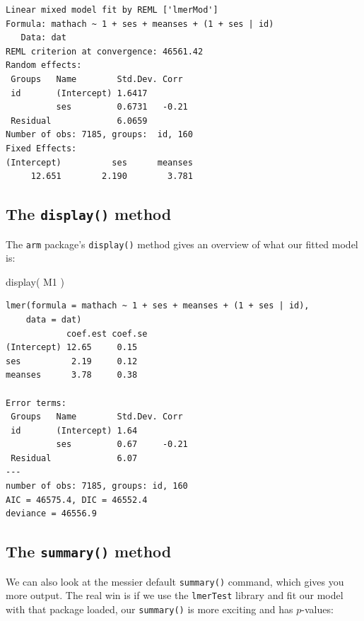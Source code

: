 \documentclass[
  letterpaper,
  DIV=11,
  numbers=noendperiod]{scrreprt}
\newenvironment{Shaded}{}{}
\newcommand{\FunctionTok}[1]{\textcolor[rgb]{0.02,0.16,0.49}{#1}}
\newcommand{\NormalTok}[1]{#1}
\begin{document}
\begin{verbatim}
Linear mixed model fit by REML ['lmerMod']
Formula: mathach ~ 1 + ses + meanses + (1 + ses | id)
   Data: dat
REML criterion at convergence: 46561.42
Random effects:
 Groups   Name        Std.Dev. Corr 
 id       (Intercept) 1.6417        
          ses         0.6731   -0.21
 Residual             6.0659        
Number of obs: 7185, groups:  id, 160
Fixed Effects:
(Intercept)          ses      meanses  
     12.651        2.190        3.781  
\end{verbatim}

\subsection{\texorpdfstring{The \texttt{display()}
method}{The display() method}}\label{the-display-method}

The \texttt{arm} package's \texttt{display()} method gives an overview
of what our fitted model is:

\begin{Shaded}
\begin{Highlighting}[]
\FunctionTok{display}\NormalTok{( M1 )}
\end{Highlighting}
\end{Shaded}

\begin{verbatim}
lmer(formula = mathach ~ 1 + ses + meanses + (1 + ses | id), 
    data = dat)
            coef.est coef.se
(Intercept) 12.65     0.15  
ses          2.19     0.12  
meanses      3.78     0.38  

Error terms:
 Groups   Name        Std.Dev. Corr  
 id       (Intercept) 1.64           
          ses         0.67     -0.21 
 Residual             6.07           
---
number of obs: 7185, groups: id, 160
AIC = 46575.4, DIC = 46552.4
deviance = 46556.9 
\end{verbatim}

\subsection{\texorpdfstring{The \texttt{summary()}
method}{The summary() method}}\label{the-summary-method}

We can also look at the messier default \texttt{summary()} command,
which gives you more output. The real win is if we use the
\texttt{lmerTest} library and fit our model with that package loaded,
our \texttt{summary()} is more exciting and has \(p\)-values:
\end{document}

